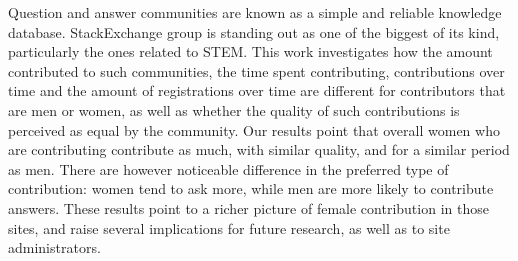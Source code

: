 Question and answer communities are known as a simple and reliable knowledge database. StackExchange group is standing out as one of the biggest of its kind, particularly the ones related to STEM. This work investigates how the amount contributed to such communities, the time spent contributing, contributions over time and the amount of registrations over time are different for contributors that are men or women, as well as whether the quality of such contributions is perceived as equal by the community. Our results point that overall women who are contributing contribute as much, with similar quality, and for a similar period as men. There are however noticeable difference in the preferred type of contribution: women tend to ask more, while men are more likely to contribute answers. These results point to a richer picture of female contribution in those sites, and raise several implications for future research, as well as to site administrators.